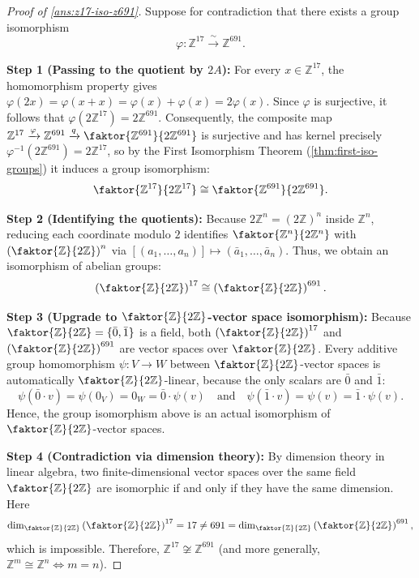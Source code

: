 \begin{content}
\begin{proof}[Proof of \cref{ans:z17-iso-z691}]
Suppose for contradiction that there exists a group isomorphism
\[
\varphi \colon \mathbb{Z}^{17} \xrightarrow{\;\sim\;} \mathbb{Z}^{691}.
\]

\textbf{Step 1 (Passing to the quotient by $2A$):} For every $x \in \mathbb{Z}^{17}$, the homomorphism property gives $\varphi(2x) = \varphi(x + x) = \varphi(x) + \varphi(x) = 2\varphi(x)$. Since $\varphi$ is surjective, it follows that $\varphi(2\mathbb{Z}^{17}) = 2\mathbb{Z}^{691}$. Consequently, the composite map $\mathbb{Z}^{17} \xrightarrow{\varphi} \mathbb{Z}^{691} \xrightarrow{q} \faktor{\mathbb{Z}^{691}}{2\mathbb{Z}^{691}}$ is surjective and has kernel precisely $\varphi^{-1}(2\mathbb{Z}^{691}) = 2\mathbb{Z}^{17}$, so by the First Isomorphism Theorem (\cref{thm:first-iso-groups}) it induces a group isomorphism:
\[
\faktor{\mathbb{Z}^{17}}{2\mathbb{Z}^{17}} \cong \faktor{\mathbb{Z}^{691}}{2\mathbb{Z}^{691}}.
\]

\textbf{Step 2 (Identifying the quotients):} Because $2\mathbb{Z}^n = (2\mathbb{Z})^n$ inside $\mathbb{Z}^n$, reducing each coordinate modulo $2$ identifies $\faktor{\mathbb{Z}^n}{2\mathbb{Z}^n}$ with $\left(\faktor{\mathbb{Z}}{2\mathbb{Z}}\right)^n$ via $[(a_1, \dots, a_n)] \mapsto (\bar{a}_1, \dots, \bar{a}_n)$. Thus, we obtain an isomorphism of abelian groups:
\[
\left(\faktor{\mathbb{Z}}{2\mathbb{Z}}\right)^{17} \cong \left(\faktor{\mathbb{Z}}{2\mathbb{Z}}\right)^{691}.
\]

\textbf{Step 3 (Upgrade to $\faktor{\mathbb{Z}}{2\mathbb{Z}}$-vector space isomorphism):} Because $\faktor{\mathbb{Z}}{2\mathbb{Z}} = \{\bar{0}, \bar{1}\}$ is a field, both $\left(\faktor{\mathbb{Z}}{2\mathbb{Z}}\right)^{17}$ and $\left(\faktor{\mathbb{Z}}{2\mathbb{Z}}\right)^{691}$ are vector spaces over $\faktor{\mathbb{Z}}{2\mathbb{Z}}$. Every additive group homomorphism $\psi \colon V \to W$ between $\faktor{\mathbb{Z}}{2\mathbb{Z}}$-vector spaces is automatically $\faktor{\mathbb{Z}}{2\mathbb{Z}}$-linear, because the only scalars are $\bar{0}$ and $\bar{1}$:
\[
\psi(\bar{0} \cdot v) = \psi(0_V) = 0_W = \bar{0} \cdot \psi(v) \quad \text{and} \quad \psi(\bar{1} \cdot v) = \psi(v) = \bar{1} \cdot \psi(v).
\]
Hence, the group isomorphism above is an actual isomorphism of $\faktor{\mathbb{Z}}{2\mathbb{Z}}$-vector spaces.

\textbf{Step 4 (Contradiction via dimension theory):} By dimension theory in linear algebra, two finite-dimensional vector spaces over the same field $\faktor{\mathbb{Z}}{2\mathbb{Z}}$ are isomorphic if and only if they have the same dimension. Here
\[
\dim_{\faktor{\mathbb{Z}}{2\mathbb{Z}}} \left(\faktor{\mathbb{Z}}{2\mathbb{Z}}\right)^{17} = 17 \neq 691 = \dim_{\faktor{\mathbb{Z}}{2\mathbb{Z}}} \left(\faktor{\mathbb{Z}}{2\mathbb{Z}}\right)^{691},
\]
which is impossible. Therefore, $\mathbb{Z}^{17} \not\cong \mathbb{Z}^{691}$ (and more generally, $\mathbb{Z}^m \cong \mathbb{Z}^n \iff m = n$).
\end{proof}
\end{content}

